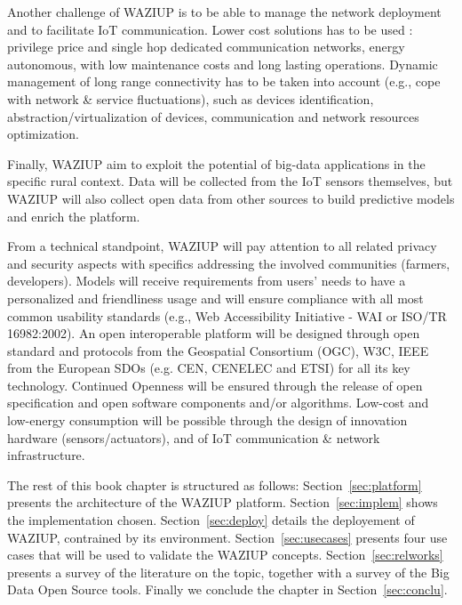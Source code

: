 Another challenge of WAZIUP is to be able to manage the network deployment and to facilitate IoT communication. 
Lower cost solutions has to be used : privilege price and single hop dedicated communication networks, energy autonomous, with low maintenance costs and long lasting operations.
Dynamic management of long range connectivity has to be taken into account (e.g., cope with network \& service fluctuations), such as devices identification, abstraction/virtualization of devices, communication and network resources optimization.

Finally, WAZIUP aim to exploit the potential of big-data applications in the specific rural context. Data will be collected from the IoT sensors themselves, but WAZIUP will also collect open data from other sources to build predictive models and enrich the platform. 

From a technical standpoint, WAZIUP will pay attention to all related privacy and security aspects with specifics addressing the involved communities (farmers, developers).
Models will receive requirements from users’ needs to have a personalized and friendliness usage and will ensure compliance with all most common usability standards (e.g., Web Accessibility Initiative - WAI or ISO/TR 16982:2002). 
An open interoperable platform will be designed through open standard and protocols from the Geospatial Consortium (OGC), W3C, IEEE from the European SDOs (e.g. CEN, CENELEC and ETSI) for all its key technology.
Continued Openness will be ensured through the release of open specification and open software components and/or algorithms.
Low-cost and low-energy consumption will be possible through the design of innovation hardware (sensors/actuators), and of IoT communication \& network infrastructure.


The rest of this book chapter is structured as follows: Section~\ref{sec:platform} presents the architecture of the WAZIUP platform. 
Section~\ref{sec:implem} shows the implementation chosen. 
Section~\ref{sec:deploy} details the deployement of WAZIUP, contrained by its environment.
Section~\ref{sec:usecases} presents four use cases that will be used to validate the WAZIUP concepts.
Section~\ref{sec:relworks} presents a survey of the literature on the topic, together with a survey of the Big Data Open Source tools.
Finally we conclude the chapter in Section~\ref{sec:conclu}.
